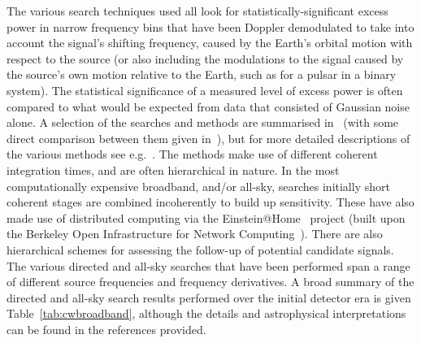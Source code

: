 The various search techniques used all look for statistically-significant excess 
power in narrow frequency bins that have been Doppler demodulated to take into account the signal's shifting 
frequency, caused by the Earth's orbital motion with respect to the source (or also including the modulations 
to the signal caused by the source's own motion relative to the Earth, such as for a pulsar in a binary 
system). The statistical significance of a measured level of excess power is often compared to what would be 
expected from data that consisted of Gaussian noise alone. A selection of the searches and methods are
summarised in~\cite{Prix:2006} (with some direct comparison between them given 
in~\cite{2016arXiv160600660W}), but for more detailed descriptions of the various methods 
see e.g.~\cite{Brady:2000, Krishnan:2004, Jaranowski:1998, Abbott:2008e, Abbott:2007a, Dupuis:2005}. The 
methods make use of different coherent integration times, and are often hierarchical in nature. In the most 
computationally expensive broadband, and/or all-sky, searches initially short coherent stages are combined 
incoherently to build up sensitivity. These have also made use of distributed computing via the 
Einstein@Home~\cite{eath} project (built upon the Berkeley Open Infrastructure for Network 
Computing~\cite{BOINC}).  There are also hierarchical schemes for assessing the follow-up of potential 
candidate signals. The various directed and all-sky searches that have been performed span a range of 
different source frequencies and frequency derivatives. A broad summary of the directed and all-sky search 
results performed over the initial detector era is given Table~\ref{tab:cwbroadband}, although the details and 
astrophysical interpretations can be found in the references provided.

